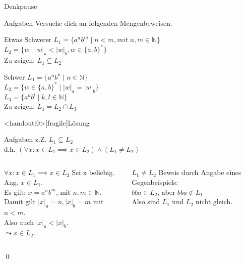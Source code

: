 {
\begin{frame}[fragile]{Denkpause}
    \begin{alertblock}{Aufgaben}
    Versuche dich an folgenden Mengenbeweisen.
    \end{alertblock}
    
    \begin{block}{Etwas Schwerer}
    $L_1=\{a^{n}b^{m} \mid n<m ,mit \; n,m\in \mathbb{N}\}$\\
    $L_2=\{w \mid |w|_a < |w|_b, w \in \{a,b\}^*\}$\\
    \vspace{0.3cm}
    Zu zeigen: $L_1 \subsetneq L_2$
    \end{block}
    \begin{block}{Schwer}
        $L_1 = \{a^nb^n \mid n \in \mathbb{N}\}$\\
        $L_2 = \{w \in \{a, b\}^* \mid |w|_a = |w|_b\}$\\
        $L_3 = \{a^kb^l \mid k,l \in \mathbb{N}\}$\\
        \vspace{0.3cm}
        Zu zeigen: $L_1 = L_2 \cap L_3$
    \end{block}
\end{frame}
}

{
\begin{frame}<handout:0>[fragile]{Lösung}
    \begin{alertblock}{Aufgaben}
    z.Z. $L_1 \subsetneq L_2$\\
    d.h. $(\forall x: x \in L_1 \implies x \in L_2) \wedge (L_1 \neq L_2)$
    \end{alertblock}
    
    \begin{columns}
    \begin{alertblock}{$\forall x: x \in L_1 \implies x \in L_2$}
        Sei x beliebig. Ang. $x \in L_1$.\\
        Es gilt: $x=a^{n}b^{m}$, mit $n,m\in\mathbb{N}$.\\
        Damit gilt $|x|_a=n, |x|_b=m$ mit $n<m$.\\
        Also auch $|x|_a < |x|_b$.\\
        $\leadsto x \in L_2$.
    \end{alertblock}
    
    \begin{alertblock}{$L_1 \neq L_2$}
        Beweis durch Angabe eines Gegenbeispiels:\\
        $bba \in L_2$, aber $bba \notin L_1$\\
        Also sind $L_1$ und $L_2$ nicht gleich.
    \end{alertblock}
    \end{columns}
    \qed
\end{frame}
}

